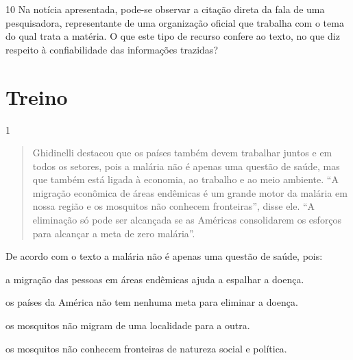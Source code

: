 
\num{10} Na notícia apresentada, pode-se observar a citação direta da fala de
uma pesquisadora, representante de uma organização oficial que trabalha
com o tema do qual trata a matéria. O que este tipo de recurso confere
ao texto, no que diz respeito à confiabilidade das informações trazidas?


\section{Treino}

\num{1}

\begin{quote}
Ghidinelli destacou que os países também devem trabalhar juntos e em
todos os setores, pois a malária não é apenas uma questão de saúde, mas
que também está ligada à economia, ao trabalho e ao meio ambiente. ``A
migração econômica de áreas endêmicas é um grande motor da malária em
nossa região e os mosquitos não conhecem fronteiras'', disse ele. ``A
eliminação só pode ser alcançada se as Américas consolidarem os esforços
para alcançar a meta de zero malária''.
\end{quote}


De acordo com o texto a malária não é apenas uma questão de saúde, pois:

\begin{escolha}

  \item a migração das pessoas em áreas endêmicas ajuda a espalhar a doença.

  \item os países da América não tem nenhuma meta para eliminar a doença.

  \item os mosquitos não migram de uma localidade para a outra. 

  \item os mosquitos não conhecem fronteiras de natureza social e política.

\end{escolha}

